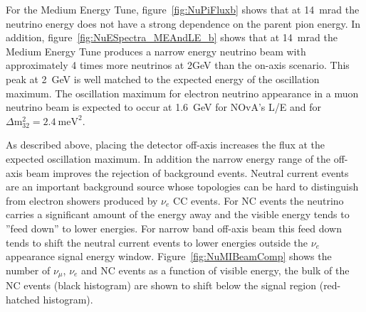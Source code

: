 For the Medium Energy Tune, figure~\ref{fig:NuPiFluxb} shows that at
14~mrad the neutrino energy
does not have a strong dependence on the parent pion energy.
In addition, figure~\ref{fig:NuESpectra_MEAndLE_b} shows that at
14~mrad the Medium
Energy Tune produces a narrow energy neutrino beam with approximately
4 times more neutrinos at 2GeV than the on-axis scenario. This peak at
2~GeV is well matched to the expected energy of the oscillation
maximum. The oscillation maximum for electron neutrino appearance in a
muon neutrino beam is expected to occur at 1.6~GeV for
NOvA's L/E and for $\Delta \textrm{m}_{32}^2=2.4~\textrm{meV}^2$.

As described above, placing the detector off-axis increases the flux
at the expected oscillation maximum. In addition the narrow energy
range of the off-axis beam improves the rejection of background
events. Neutral current events are an important background source
whose topologies can be hard to distinguish from electron showers
produced by $\nu_e$ CC events. For NC events the neutrino carries a
significant amount of the energy away and the visible energy tends to
''feed down'' to lower energies. For narrow band off-axis  beam this
feed down tends to shift the neutral current events to lower energies
outside the $\nu_e$ appearance signal energy window. Figure~\ref{fig:NuMIBeamComp}
shows the number of $\nu_{\mu}$, $\nu_e$ and NC events as a function
of visible energy, the bulk of the NC events (black histogram) are shown to shift below
the signal region (red-hatched histogram).



